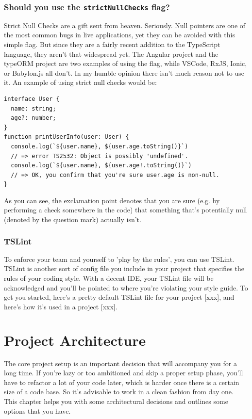 \documentclass[12pt,a4paper]{report}
\begin{document}
\subsection{Should you use the \texttt{strictNullChecks} flag?}
Strict Null Checks are a gift sent from heaven. Seriously. Null pointers are one of the most common bugs in live applications, yet they can be avoided with this simple flag. But since they are a fairly recent addition to the TypeScript language, they aren't that widespread yet. The Angular project and the typeORM project are two examples of using the flag, while VSCode, RxJS, Ionic, or Babylon.js all don't. In my humble opinion there isn't much reason not to use it. An example of using strict null checks would be:
\begin{lstlisting}
interface User {
  name: string;
  age?: number;
}
function printUserInfo(user: User) {
  console.log(`${user.name}, ${user.age.toString()}`)
  // => error TS2532: Object is possibly 'undefined'.
  console.log(`${user.name}, ${user.age!.toString()}`)
  // => OK, you confirm that you're sure user.age is non-null.
}
\end{lstlisting}
As you can see, the exclamation point denotes that you are sure (e.g. by performing a check somewhere in the code) that something that's potentially null (denoted by the question mark) actually isn't.


\subsection{TSLint}
To enforce your team and yourself to 'play by the rules', you can use TSLint. TSLint is another sort of config file you include in your project that specifies the rules of your coding style. With a decent IDE, your TSLint file will be acknowledged and you'll be pointed to where you're violating your style guide. To get you started, here's a pretty default TSLint file for your project [xxx], and here's how it's used in a project [xxx].



\chapter {Project Architecture}
The core project setup is an important decision that will accompany you for a long time. If you're lazy or too ambitioned and skip a proper setup phase, you'll have to refactor a lot of your code later, which is harder once there is a certain size of a code base. So it's advisable to work in a clean fashion from day one. This chapter helps you with some architectural decisions and outlines some options that you have.
\end{document}
